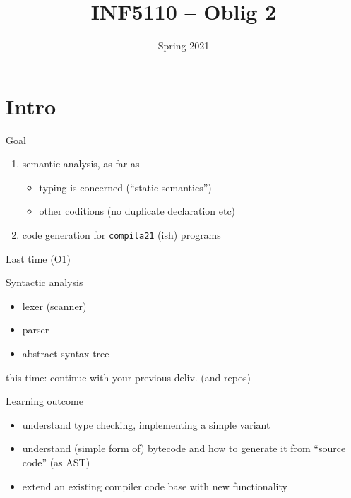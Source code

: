 \documentclass{beamer}
\date{Spring 2021}
\title{INF5110 -- Oblig  2}
\renewcommand{\maketitle}{}
\begin{document}
\maketitle
\section{Intro}
\label{sec:orgefa8a4e}
\begin{frame}[label={sec:org31ae31f},fragile]{Goal}
 \begin{enumerate}
\item \alert{semantic  analysis}, as far as 
\begin{itemize}
\item \alert{typing} is concerned (``static semantics'')
\item other coditions (no duplicate declaration etc)
\end{itemize}

\item \alert{code generation} for \texttt{compila21} (ish) programs
\end{enumerate}
\end{frame}






\begin{frame}[label={sec:org9bb11f1}]{Last time (O1)}
\begin{block}{Syntactic analysis}
\begin{itemize}
\item lexer (scanner)
\item parser
\item abstract syntax tree
\end{itemize}
\end{block}



\alert{this time}: continue with your previous deliv. (and repos)
\end{frame}



\begin{frame}[label={sec:org8671d07}]{Learning outcome}
\begin{itemize}
\item understand type checking, implementing a simple variant
\end{itemize}


\begin{itemize}
\item understand (simple form of) bytecode and how to generate it from ``source
code'' (as AST)

\item extend an existing compiler code base with new functionality
\end{itemize}
\end{frame}
\end{document}
